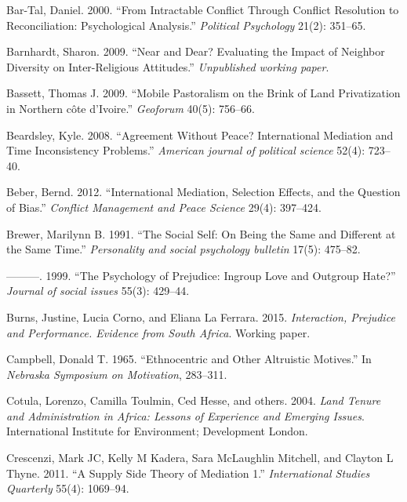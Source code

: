 \documentclass[11pt]{article}
\begin{document}
\hypertarget{ref-bar2000intractable}{}
Bar-Tal, Daniel. 2000. ``From Intractable Conflict Through Conflict
Resolution to Reconciliation: Psychological Analysis.'' \emph{Political
Psychology} 21(2): 351--65.

\hypertarget{ref-barnhardt2009near}{}
Barnhardt, Sharon. 2009. ``Near and Dear? Evaluating the Impact of
Neighbor Diversity on Inter-Religious Attitudes.'' \emph{Unpublished
working paper}.

\hypertarget{ref-bassett2009mobile}{}
Bassett, Thomas J. 2009. ``Mobile Pastoralism on the Brink of Land
Privatization in Northern côte d'Ivoire.'' \emph{Geoforum} 40(5):
756--66.

\hypertarget{ref-beardsley2008agreement}{}
Beardsley, Kyle. 2008. ``Agreement Without Peace? International
Mediation and Time Inconsistency Problems.'' \emph{American journal of
political science} 52(4): 723--40.

\hypertarget{ref-beber2012international}{}
Beber, Bernd. 2012. ``International Mediation, Selection Effects, and
the Question of Bias.'' \emph{Conflict Management and Peace Science}
29(4): 397--424.

\hypertarget{ref-brewer1991social}{}
Brewer, Marilynn B. 1991. ``The Social Self: On Being the Same and
Different at the Same Time.'' \emph{Personality and social psychology
bulletin} 17(5): 475--82.

\hypertarget{ref-brewer1999ingroupOutgroup}{}
---------. 1999. ``The Psychology of Prejudice: Ingroup Love and
Outgroup Hate?'' \emph{Journal of social issues} 55(3): 429--44.

\hypertarget{ref-burns2015interaction}{}
Burns, Justine, Lucia Corno, and Eliana La Ferrara. 2015.
\emph{Interaction, Prejudice and Performance. Evidence from South
Africa}. Working paper.

\hypertarget{ref-campbell1965ethno}{}
Campbell, Donald T. 1965. ``Ethnocentric and Other Altruistic Motives.''
In \emph{Nebraska Symposium on Motivation}, 283--311.

\hypertarget{ref-cotula2004land}{}
Cotula, Lorenzo, Camilla Toulmin, Ced Hesse, and others. 2004.
\emph{Land Tenure and Administration in Africa: Lessons of Experience
and Emerging Issues}. International Institute for Environment;
Development London.

\hypertarget{ref-crescenzi2011supply}{}
Crescenzi, Mark JC, Kelly M Kadera, Sara McLaughlin Mitchell, and
Clayton L Thyne. 2011. ``A Supply Side Theory of Mediation 1.''
\emph{International Studies Quarterly} 55(4): 1069--94.
\end{document}
